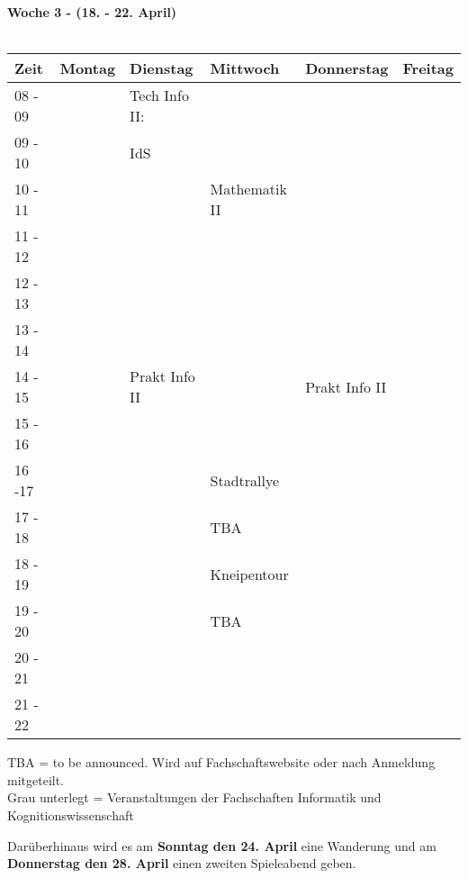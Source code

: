 \textbf{Woche 3 - (18. - 22. April)}\\
\\
\begin{tabular}{|l|p{}|p{}|p{}|p{}|p{}|} \hline
Zeit    & Montag & Dienstag & Mittwoch & Donnerstag & Freitag \\ \hline 
08 - 09 & & \footnotesize{Tech Info II:} & & & \\ \cline{1-1}
09 - 10 & & \footnotesize{IdS} & & & \\ \cline{1-1} \cline{4-4}
10 - 11 & & & \footnotesize{Mathematik II} & & \\ \cline{1-1} \cline{3-3}
11 - 12 & & & & & \\ \cline{1-1} \cline{4-4}
12 - 13 & & & & & \\ \cline{1-1}
13 - 14 & & & & & \\ \cline{1-1} \cline{3-3} \cline{5-5}
14 - 15 & & \footnotesize{Prakt Info II} & & \footnotesize{Prakt Info II} & \\ \cline{1-1}
15 - 16 & & & & & \\ \cline{1-1} \cline{3-5}
16 -17  & & & \cellcolor{lightlightgray} \footnotesize{Stadtrallye} & & \\ \cline{1-1}
17 - 18 & & & \cellcolor{lightlightgray} \scriptsize{TBA} & & \\ \cline{1-1} \cline{4-4}
18 - 19 & & & \cellcolor{lightlightgray} \footnotesize{Kneipentour} & & \\ \cline{1-1}
19 - 20 & & & \cellcolor{lightlightgray} \scriptsize{TBA} & & \\ \cline{1-1}
20 - 21 & & & \cellcolor{lightlightgray} & & \\ \cline{1-1}
21 - 22 & & & \cellcolor{lightlightgray} & & \\ \hline
\end{tabular}

{\scriptsize TBA = to be announced. Wird auf Fachschaftswebsite oder nach Anmeldung mitgeteilt.} \\
{\scriptsize Grau unterlegt = Veranstaltungen der Fachschaften Informatik und Kognitionswissenschaft }

\normalsize
Darüberhinaus wird es am \textbf{Sonntag den 24. April} eine Wanderung und am 
\textbf{Donnerstag den 28. April} einen zweiten Spieleabend geben.

\newpage
\normalsize

